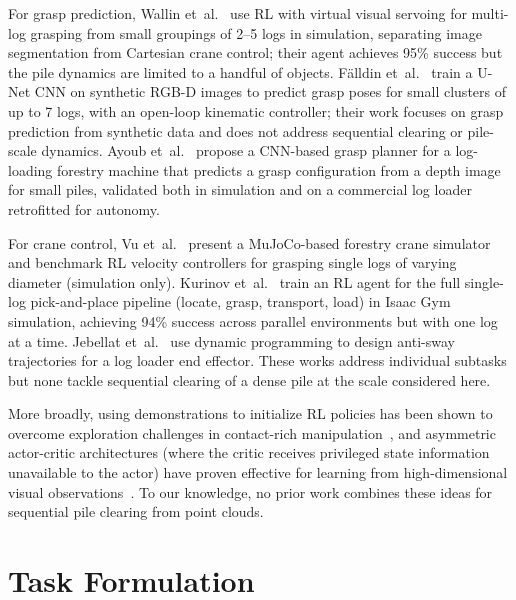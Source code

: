 \documentclass[conference]{IEEEtran}
\begin{document}
For grasp prediction, Wallin et~al.~\cite{wallin2024multilog} use RL with virtual visual servoing for multi-log grasping from small groupings of 2--5 logs in simulation, separating image segmentation from Cartesian crane control; their agent achieves 95\% success but the pile dynamics are limited to a handful of objects.
F{\"a}lldin et~al.~\cite{falldin2025synthesizing} train a U-Net CNN on synthetic RGB-D images to predict grasp poses for small clusters of up to 7 logs, with an open-loop kinematic controller; their work focuses on grasp prediction from synthetic data and does not address sequential clearing or pile-scale dynamics.
Ayoub et~al.~\cite{ayoub2023grasp} propose a CNN-based grasp planner for a log-loading forestry machine that predicts a grasp configuration from a depth image for small piles, validated both in simulation and on a commercial log loader retrofitted for autonomy.

For crane control, Vu et~al.~\cite{vu2025autonomous} present a MuJoCo-based forestry crane simulator and benchmark RL velocity controllers for grasping single logs of varying diameter (simulation only).
Kurinov et~al.~\cite{kurinov2025reinforcement} train an RL agent for the full single-log pick-and-place pipeline (locate, grasp, transport, load) in Isaac Gym simulation, achieving 94\% success across parallel environments but with one log at a time.
Jebellat et~al.~\cite{jebellat2025designing} use dynamic programming to design anti-sway trajectories for a log loader end effector.
These works address individual subtasks but none tackle sequential clearing of a dense pile at the scale considered here.

More broadly, using demonstrations to initialize RL policies has been shown to overcome exploration challenges in contact-rich manipulation~\cite{rajeswaran2018learning, nair2018overcoming}, and asymmetric actor-critic architectures (where the critic receives privileged state information unavailable to the actor) have proven effective for learning from high-dimensional visual observations~\cite{pinto2018asymmetric}.
To our knowledge, no prior work combines these ideas for sequential pile clearing from point clouds.

\section{Task Formulation}
\end{document}
